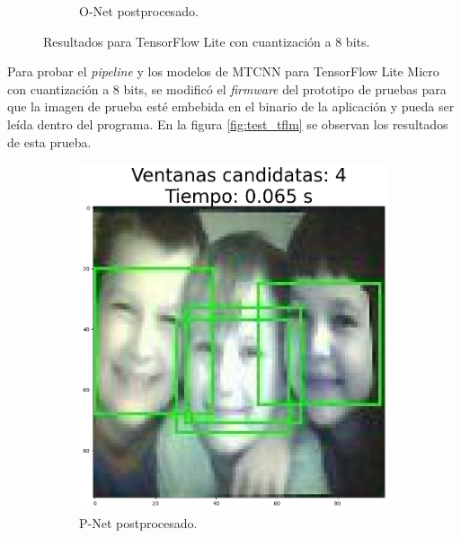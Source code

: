 \begin{figure}[!htpb]
\begin{subfigure}[b]{0.28\textwidth}
         \caption{O-Net postprocesado.}
         \label{fig:2de3}
     \end{subfigure}
     \hfill
        \caption{Resultados para TensorFlow Lite con cuantización a 8 bits.}
        \label{fig:test_tf_onet}
\end{figure}

Para probar el \textit{pipeline} y los modelos de MTCNN para TensorFlow Lite Micro con cuantización a 8 bits, se modificó el \textit{firmware} del prototipo de pruebas para que la imagen de prueba esté embebida en el binario de la aplicación y pueda ser leída dentro del programa. En la figura \ref{fig:test_tflm} se observan los resultados de esta prueba.

\begin{figure}[!htpb]
     \centering
     \begin{subfigure}[b]{0.28\textwidth}
         \centering
         \includegraphics[width=\textwidth]{./Figures/pnet.png}
         \caption{P-Net postprocesado.}
         \label{fig:1de3}
     \end{subfigure}
     \hfill
     \begin{subfigure}[b]{0.28\textwidth}
         \centering

\end{subfigure}
\end{figure}
